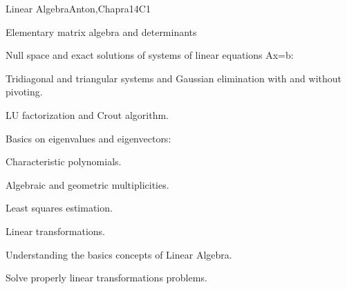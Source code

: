 \begin{syllabus}
\begin{unit}{Linear Algebra}{}{Anton,Chapra}{14}{C1}
   \begin{topics}
    \item Elementary matrix algebra and determinants
    \item Null space and exact solutions of systems of linear equations Ax=b:
	  \begin{subtopics}
	    \item Tridiagonal and triangular systems and Gaussian elimination with and without pivoting.
	    \item LU factorization and Crout algorithm.
	  \end{subtopics}
    \item Basics on eigenvalues and eigenvectors:	  
	  \begin{subtopics}
	    \item Characteristic polynomials.
	    \item Algebraic and geometric multiplicities.
	  \end{subtopics}
    \item Least squares estimation.
    \item Linear transformations.
    \end{topics}

   \begin{learningoutcomes}
      \item Understanding the basics concepts of Linear Algebra.
      \item Solve properly linear transformations problems.
      \end{learningoutcomes}
\end{unit}


\end{syllabus}
